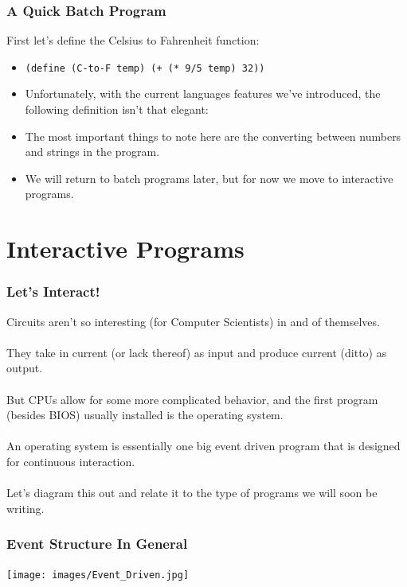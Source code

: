 \documentclass{beamer}
\begin{document}
\begin{frame}
  \frametitle{A Quick Batch Program}
  First let's define the Celsius to Fahrenheit function:
  \begin{itemize}
  \item<2-> \texttt{(define (C-to-F temp) (+ (* 9/5 temp) 32))}
  \item<3-> Unfortunately, with the current languages features we've introduced,
    the following definition isn't that elegant: \convert
  \item<4-> The most important things to note here are the converting between
    numbers and strings in the program.
  \item<5-> We will return to batch programs later, but for now we move to interactive programs.
  \end{itemize}
\end{frame}

\section{Interactive Programs}
\begin{frame}
  \frametitle{Let's Interact!}
  Circuits aren't so interesting (for Computer Scientists) in and of themselves.
  \\\\
  \pause
  They take in current (or lack thereof) as input and produce current (ditto) as output.
  \\\\
  \pause
  But CPUs allow for some more complicated behavior, and the first program (besides BIOS) usually installed is the operating system.
  \\\\
  \pause
  An operating system is essentially one big event driven program that is
  designed for continuous interaction.
  \\\\
  \pause
  Let's diagram this out and relate it to the type of programs we will soon
  be writing.
\end{frame}

\begin{frame}
  \frametitle{Event Structure In General}
  \begin{center}
    \texttt{[image: images/Event\_Driven.jpg]}
  \end{center}
\end{frame}
\end{document}
